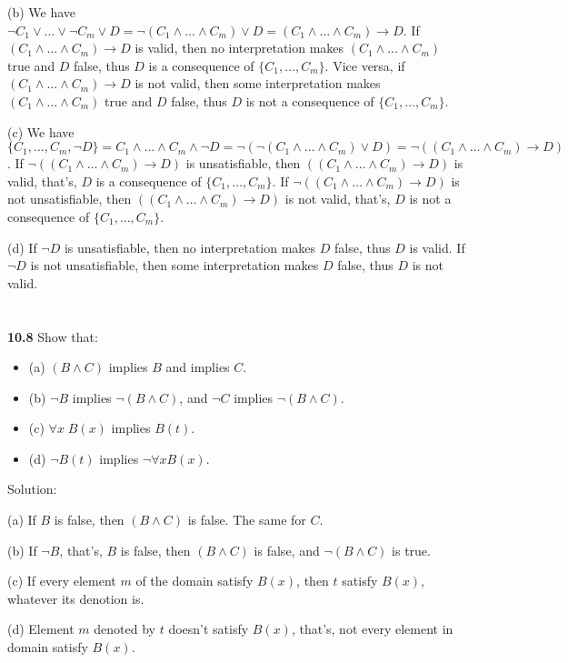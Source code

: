 \documentclass{ctexart}
\begin{document}
(b)
We have $\lnot C_1 \lor \dots \lor \lnot C_m \lor D = \lnot (C_1 \land \dots \land C_m) \lor D
= (C_1 \land \dots \land C_m) \to D$.
If $(C_1 \land \dots \land C_m) \to D$ is valid, then no interpretation makes $(C_1 \land \dots \land C_m)$ true
and $D$ false, thus $D$ is a consequence of $\{C_1 , \dots , C_m \}$. Vice versa, if
$(C_1 \land \dots \land C_m) \to D$ is not valid, then some interpretation makes $(C_1 \land \dots \land C_m)$ true
and $D$ false, thus $D$ is not a consequence of $\{C_1 , \dots , C_m \}$.

(c) We have $\{C_1 , \dots , C_m, \lnot D\} = C_1 \land \dots \land C_m \land \lnot D
= \lnot (\lnot (C_1 \land \dots \land C_m) \lor D)
= \lnot ((C_1 \land \dots \land C_m) \to D)
$. If $\lnot ((C_1 \land \dots \land C_m) \to D)$ is unsatisfiable, then $((C_1 \land \dots \land C_m) \to D)$
is valid, that's, $D$ is a consequence of $\{C_1 , \dots , C_m \}$.
If $\lnot ((C_1 \land \dots \land C_m) \to D)$ is not unsatisfiable, then $((C_1 \land \dots \land C_m) \to D)$
is not valid, that's, $D$ is not a consequence of $\{C_1 , \dots , C_m \}$.

(d) If $\lnot D$ is unsatisfiable, then no interpretation makes $D$ false, thus $D$ is valid.
If $\lnot D$ is not unsatisfiable, then some interpretation makes $D$ false, thus $D$ is not valid.

\section*{}
\textbf{10.8}
Show that:
\begin{itemize}
\item (a) $(B \land C)$ implies $B$ and implies $C$.
\item (b) $\lnot B$ implies $\lnot(B \land C)$, and $\lnot C$ implies $\lnot (B \land C)$.
\item (c) $\forall x\; B(x)$ implies $B(t)$.
\item (d) $\lnot B(t)$ implies $\lnot \forall x B(x)$.
\end{itemize}

Solution:

(a) If $B$ is false, then $(B \land C)$ is false. The same for $C$.

(b) If $\lnot B$, that's, $B$ is false, then $(B \land C)$ is false, and $\lnot(B \land C)$ is true.

(c) If every element $m$ of the domain satisfy $B(x)$, then $t$ satisfy $B(x)$, whatever its denotion
is.

(d) Element $m$ denoted by $t$ doesn't satisfy $B(x)$, that's, not every element in domain satisfy $B(x)$.
\end{document}

